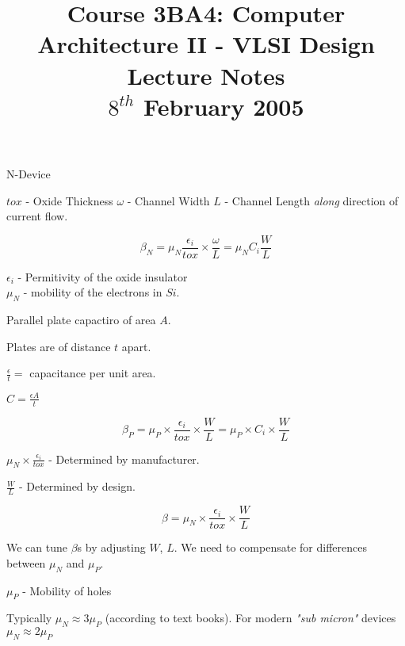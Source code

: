 \documentclass[a4paper,12pt]{article}
\begin{document}
\title{Course 3BA4: Computer Architecture II - VLSI Design \\ Lecture Notes \\ $8^{th}$ February 2005}

\maketitle

\begin{table}[hbtp]


\caption{N-Device}

\end{table}

$tox$ - Oxide Thickness
$\omega$ - Channel Width
$L$ - Channel Length \emph{along} direction of current flow.

\[ \beta_{N} = \mu_{N} \frac{\epsilon_{i}}{tox} \times \frac{\omega}{L}
= \mu_{N} C_{i} \frac{W}{L} \]

$\epsilon_{i}$ - Permitivity of the oxide insulator \\
$\mu_{N}$ - mobility of the electrons in $Si$.


Parallel plate capactiro of area $A$.

Plates are of distance $t$ apart.

$\frac{\epsilon}{t} =$ capacitance per unit area.

$C = \frac{\epsilon A}{t}$

\[ \beta_{P} = \mu_{P} \times \frac{\epsilon_{i}}{tox} \times
\frac{W}{L} = \mu_{P} \times C_{i} \times \frac{W}{L} \]


$\mu_{N} \times \frac{\epsilon_{i}}{tox}$ - Determined by manufacturer.

$\frac{W}{L}$ - Determined by design.


\[ \beta = \mu_{N} \times \frac{\epsilon_{i}}{tox} \times \frac{W}{L} \]


We can tune $\beta$s by adjusting $W$, $L$. We need to compensate for
differences between $\mu_{N}$ and $\mu_{P}$.


$\mu_{P}$ - Mobility of holes

Typically $\mu_{N} \approx 3 \mu_{P}$ (according to text books).
For modern \emph{"sub micron"} devices $\mu_{N} \approx 2 \mu_{P}$

\begin{table}[hbtp]


\end{table}
\end{document}
